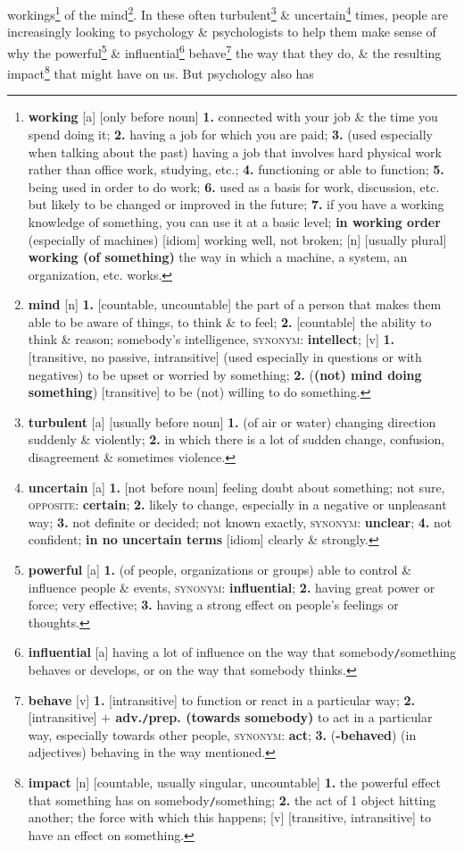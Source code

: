 \documentclass[oneside]{book}
\numberwithin{equation}{section}
\begin{document}
workings\footnote{\textbf{working} [a] [only before noun] \textbf{1.} connected with your job \& the time you spend doing it; \textbf{2.} having a job for which you are paid; \textbf{3.} (used especially when talking about the past) having a job that involves hard physical work rather than office work, studying, etc.; \textbf{4.} functioning or able to function; \textbf{5.} being used in order to do work; \textbf{6.} used as a basis for work, discussion, etc. but likely to be changed or improved in the future; \textbf{7.} if you have a working knowledge of something, you can use it at a basic level; \textbf{in working order} (especially of machines) [idiom] working well, not broken; [n] [usually plural] \textbf{working (of something)} the way in which a machine, a system, an organization, etc. works.} of the mind\footnote{\textbf{mind} [n] \textbf{1.} [countable, uncountable] the part of a person that makes them able to be aware of things, to think \& to feel; \textbf{2.} [countable] the ability to think \& reason; somebody's intelligence, \textsc{synonym}: \textbf{intellect}; [v] \textbf{1.} [transitive, no passive, intransitive] (used especially in questions or with negatives) to be upset or worried by something; \textbf{2.} (\textbf{(not) mind doing something}) [transitive] to be (not) willing to do something.}. In these often turbulent\footnote{\textbf{turbulent} [a] [usually before noun] \textbf{1.} (of air or water) changing direction suddenly \& violently; \textbf{2.} in which there is a lot of sudden change, confusion, disagreement \& sometimes violence.} \& uncertain\footnote{\textbf{uncertain} [a] \textbf{1.} [not before noun] feeling doubt about something; not sure, \textsc{opposite}: \textbf{certain}; \textbf{2.} likely to change, especially in a negative or unpleasant way; \textbf{3.} not definite or decided; not known exactly, \textsc{synonym}: \textbf{unclear}; \textbf{4.} not confident; \textbf{in no uncertain terms} [idiom] clearly \& strongly.} times, people are increasingly looking to psychology \& psychologists to help them make sense of why the powerful\footnote{\textbf{powerful} [a] \textbf{1.} (of people, organizations or groups) able to control \& influence people \& events, \textsc{synonym}: \textbf{influential}; \textbf{2.} having great power or force; very effective; \textbf{3.} having a strong effect on people's feelings or thoughts.} \& influential\footnote{\textbf{influential} [a] having a lot of influence on the way that somebody\texttt{/}something behaves or develops, or on the way that somebody thinks.} behave\footnote{\textbf{behave} [v] \textbf{1.} [intransitive] to function or react in a particular way; \textbf{2.} [intransitive] \textbf{$+$ adv.\texttt{/}prep. (towards somebody)} to act in a particular way, especially towards other people, \textsc{synonym}: \textbf{act}; \textbf{3.} (\textbf{-behaved}) (in adjectives) behaving in the way mentioned.} the way that they do, \& the resulting impact\footnote{\textbf{impact} [n] [countable, usually singular, uncountable] \textbf{1.} the powerful effect that something has on somebody\texttt{/}something; \textbf{2.} the act of 1 object hitting another; the force with which this happens; [v] [transitive, intransitive] to have an effect on something.} that might have on us. But psychology also has 
\end{document}
